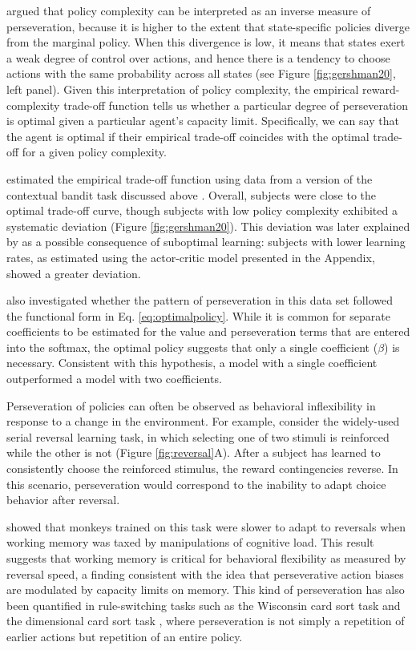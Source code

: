 \documentclass[11pt]{article}
\begin{document}
\citet{gershman20} argued that policy complexity can be interpreted as an inverse measure of perseveration, because it is higher to the extent that state-specific policies diverge from the marginal policy. When this divergence is low, it means that states exert a weak degree of control over actions, and hence there is a tendency to choose actions with the same probability across all states (see Figure \ref{fig:gershman20}, left panel). Given this interpretation of policy complexity, the empirical reward-complexity trade-off function tells us whether a particular degree of perseveration is optimal given a particular agent's capacity limit. Specifically, we can say that the agent is optimal if their empirical trade-off coincides with the optimal trade-off for a given policy complexity.

\citet{gershman20} estimated the empirical trade-off function using data from a version of the contextual bandit task discussed above \citep{collins18}. Overall, subjects were close to the optimal trade-off curve, though subjects with low policy complexity exhibited a systematic deviation (Figure \ref{fig:gershman20}). This deviation was later explained by \citet{gershmanlai20} as a possible consequence of suboptimal learning: subjects with lower learning rates, as estimated using the actor-critic model presented in the Appendix, showed a greater deviation.

\citet{gershman20} also investigated whether the pattern of perseveration in this data set followed the functional form in Eq. \ref{eq:optimalpolicy}. While it is common for separate coefficients to be estimated for the value and perseveration terms that are entered into the softmax, the optimal policy suggests that only a single coefficient ($\beta$) is necessary. Consistent with this hypothesis, a model with a single coefficient outperformed a model with two coefficients.

Perseveration of policies can often be observed as behavioral inflexibility in response to a change in the environment. For example, consider the widely-used serial reversal learning task, in which selecting one of two stimuli is reinforced while the other is not (Figure \ref{fig:reversal}A). After a subject has learned to consistently choose the reinforced stimulus, the reward contingencies reverse. In this scenario, perseveration would correspond to the inability to adapt choice behavior after reversal. 

\cite{Hassett2017-dv} showed that monkeys trained on this task were slower to adapt to reversals when working memory was taxed by manipulations of cognitive load. This result suggests that working memory is critical for behavioral flexibility as measured by reversal speed, a finding consistent with the idea that perseverative action biases are modulated by capacity limits on memory. This kind of perseveration has also been quantified in rule-switching tasks such as the Wisconsin card sort task \citep{Berg1948-bi} and the dimensional card sort task \citep{Zelazo2006-kj}, where perseveration is not simply a repetition of earlier actions but repetition of an entire policy.
\end{document}
